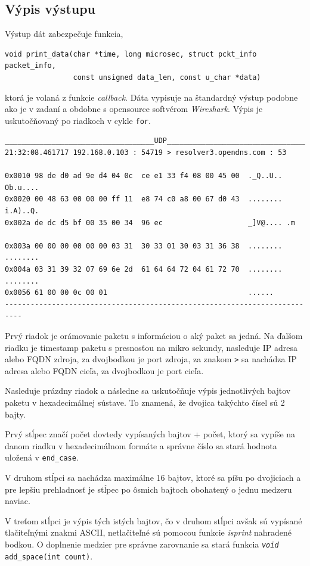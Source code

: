 \documentclass[11pt, a4paper]{article}
\begin{document}
	\subsection{Výpis výstupu}
	Výstup dát zabezpečuje funkcia,
	\begin{lstlisting}
void print_data(char *time, long microsec, struct pckt_info packet_info, 
				const unsigned data_len, const u_char *data)
	\end{lstlisting}
	ktorá je volaná z funkcie \emph{callback}. Dáta vypisuje na štandardný výstup podobne ako je v zadaní a obdobne s opensource softvérom \emph{Wireshark}. Výpis je uskutočňovaný po riadkoch v cykle \texttt{for}.
\begin{verbatim}
___________________________________UDP____________________________________
21:32:08.461717 192.168.0.103 : 54719 > resolver3.opendns.com : 53

0x0010 98 de d0 ad 9e d4 04 0c  ce e1 33 f4 08 00 45 00  ._Q..U.. Ob.u....
0x0020 00 48 63 00 00 00 ff 11  e8 74 c0 a8 00 67 d0 43  ........ i.A)..Q.
0x002a de dc d5 bf 00 35 00 34  96 ec                    _]V@.... .m

0x003a 00 00 00 00 00 00 03 31  30 33 01 30 03 31 36 38  ........ ........
0x004a 03 31 39 32 07 69 6e 2d  61 64 64 72 04 61 72 70  ........ ........
0x0056 61 00 00 0c 00 01                                 ......
--------------------------------------------------------------------------
\end{verbatim}
Prvý riadok je orámovanie paketu s informáciou o aký paket sa jedná. Na ďalšom riadku je timestamp paketu s presnosťou na mikro sekundy, nasleduje IP adresa alebo FQDN zdroja, za dvojbodkou je port zdroja, za znakom \texttt{>} sa nachádza IP adresa alebo FQDN cieľa, za dvojbodkou je port cieľa. 

Nasleduje prázdny riadok a následne sa uskutočňuje výpis jednotlivých bajtov paketu v hexadecimálnej sústave. To znamená, že dvojica takýchto čísel sú 2 bajty.

Prvý stĺpec značí počet dovtedy vypísaných bajtov + počet, ktorý sa vypíše na danom riadku v hexadecimálnom formáte a správne číslo sa stará hodnota uložená v \texttt{end\_case}. 

V druhom stĺpci sa nachádza maximálne 16 bajtov, ktoré sa píšu po dvojiciach a pre lepšiu prehladnosť je stĺpec po ôsmich bajtoch obohatený o jednu medzeru naviac. 

V treťom stĺpci je výpis tých istých bajtov, čo v druhom stĺpci avšak sú vypísané tlačiteľnými znakmi ASCII, netlačiteľné sú pomocou funkcie  \emph{isprint} nahradené bodkou. O doplnenie medzier pre správne zarovnanie sa stará funkcia \texttt{\emph{void} add\_space(int count)}.
\end{document}
